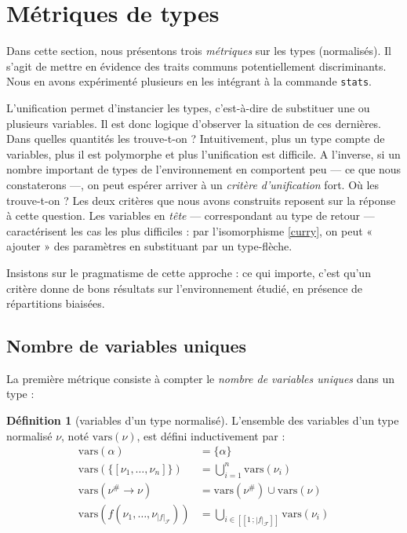 \documentclass[a4paper]{report}
\theoremstyle{definition}
\newtheorem{definition}[theoreme]{Définition}
\newcommand{\interval}[2]{[\![#1\,;#2]\!]}
\newcommand{\mset}[1]{\{\![#1]\!\}}
\newcommand{\F}{\mathscr{F}}
\begin{document}

\section{Métriques de types}

Dans cette section, nous présentons trois \emph{métriques} sur les types (normalisés). Il s'agit de mettre en évidence des traits communs potentiellement discriminants. Nous en avons expérimenté plusieurs en les intégrant à la commande \texttt{stats}.

L'unification permet d'instancier les types, c'est-à-dire de substituer une ou plusieurs variables. Il est donc logique d'observer la situation de ces dernières. Dans quelles quantités les trouve-t-on ? Intuitivement, plus un type compte de variables, plus il est polymorphe et plus l'unification est difficile. A l'inverse, si un nombre important de types de l'environnement en comportent peu — ce que nous constaterons —, on peut espérer arriver à un \emph{critère d'unification} fort. Où les trouve-t-on ? Les deux critères que nous avons construits reposent sur la réponse à cette question. Les variables en \emph{tête} — correspondant au type de retour — caractérisent les cas les plus difficiles : par l'isomorphisme \eqref{curry}, on peut « ajouter » des paramètres en substituant par un type-flèche.

Insistons sur le pragmatisme de cette approche : ce qui importe, c'est qu'un critère donne de bons résultats sur l'environnement étudié, en présence de répartitions biaisées.


\subsection{Nombre de variables uniques}

La première métrique consiste à compter le \emph{nombre de variables uniques} dans un type :

\begin{definition}[variables d'un type normalisé]
	L'ensemble des variables d'un type normalisé $\nu$, noté $\mathrm{vars} (\nu)$, est défini inductivement par :
	\begin{align*}
			\mathrm{vars} (\alpha) &=
			\{ \alpha \}
		\\
			\mathrm{vars} (\mset{\nu_1, \dots, \nu_n}) &=
			\bigcup _{i=1}^n \mathrm{vars} (\nu_i)
		\\
			\mathrm{vars} (\nu^\# \rightarrow \nu) &=
			\mathrm{vars} (\nu^\#) \cup \mathrm{vars} (\nu)
		\\
			\mathrm{vars} (f (\nu_1, \dots, \nu_{|f|_\F})) &=
			\bigcup_{i \in \interval 1 {|f|_\F}} \mathrm{vars} (\nu_i)
	\end{align*}
\end{definition}
\end{document}
